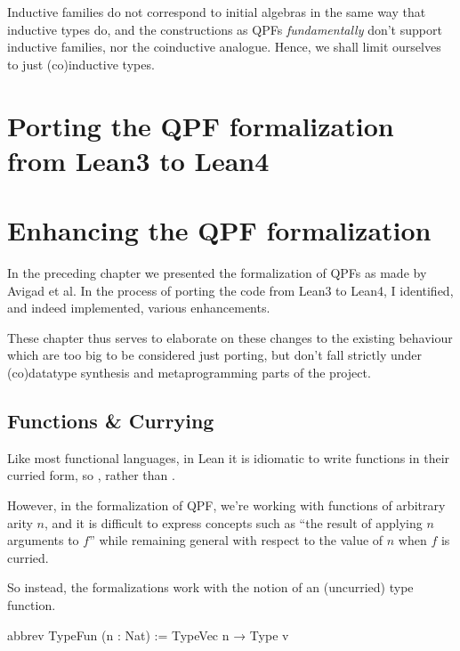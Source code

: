 \documentclass[titlepage]{report}
\begin{document}
Inductive families do not correspond to initial algebras in the same way that inductive types do, and the constructions as QPFs \emph{fundamentally} don't support inductive families, nor the coinductive analogue.
Hence, we shall limit ourselves to just (co)inductive types.




\chapter{Porting the QPF formalization from Lean3 to Lean4}
\label{ch:porting}








\chapter{Enhancing the QPF formalization}
\label{ch:enhancing}


In the preceding chapter we presented the formalization of QPFs as made by Avigad et al.
In the process of porting the code from Lean3 to Lean4, 
I identified, and indeed implemented, various enhancements. 

These chapter thus serves to elaborate on these changes to the existing behaviour which are too big
to be considered just porting, but don't fall strictly under (co)datatype synthesis and metaprogramming parts of the project.




\section{Functions \& Currying}
Like most functional languages, in Lean it is idiomatic to write functions in their curried form, 
so , rather than .

However, in the formalization of QPF, we're working with functions of arbitrary arity $n$, and it 
is difficult to express concepts such as ``the result of applying $n$ arguments to $f$'' while remaining
general with respect to the value of $n$ when $f$ is curried.

So instead, the formalizations work with the notion of an (uncurried) type function.

\begin{leancode}
    abbrev TypeFun (n : Nat)
      := TypeVec n → Type v
\end{leancode}
\end{document}
